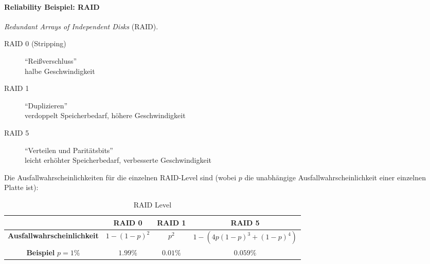 \documentclass[a4paper, 11pt, accentcolor = tud3b]{tudreport}
\begin{document}
	        \paragraph{Reliability Beispiel: RAID}
			    \textit{Redundant Arrays of Independent Disks} (RAID).
			    
			    \begin{description}
			    	\item[RAID 0 (Stripping)] \enquote{Reißverschluss} \\ halbe Geschwindigkeit
			    	\item[RAID 1] \enquote{Duplizieren} \\ verdoppelt Speicherbedarf, höhere Geschwindigkeit
			    	\item[RAID 5] \enquote{Verteilen und Paritätsbits} \\ leicht erhöhter Speicherbedarf, verbesserte Geschwindigkeit
			    \end{description}
			    
			    Die Ausfallwahrscheinlichkeiten für die einzelnen RAID-Level sind (wobei \(p\) die unabhängige Ausfallwahrscheinlichkeit einer einzelnen Platte ist):
			    \begin{table}[H]
			    	\centering
			    	\begin{tabular}{| c | c | c | c |}
			    		\hline
			    		                                   & \textbf{RAID 0}     & \textbf{RAID 1} & \textbf{RAID 5}               \\ \hline
			    		\textbf{Ausfallwahrscheinlichkeit} & \( 1 - (1 - p)^2 \) & \( p^2 \)       & \( 1 - (4p(1-p)^3+(1-p)^4) \) \\ \hline
			    		\textbf{Beispiel} \( p = 1\% \)    & \( 1.99\% \)        & \( 0.01\% \)    & \( 0.059\% \)                 \\ \hline
			    	\end{tabular}
			    	\caption{RAID Level}
			    \end{table}
\end{document}
